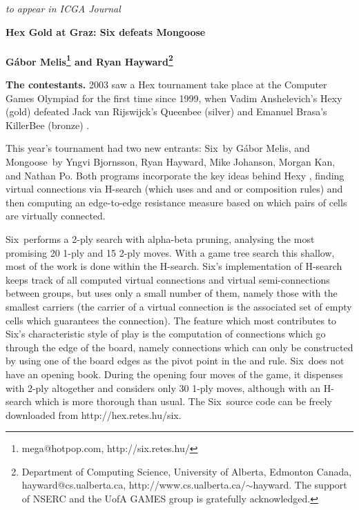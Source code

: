 \documentclass[12pt]{article}
\def\Six{{\sc Six}}
\def\Mg{{\sc Mongoose}}
\begin{document}
\pagestyle{plain}

\vspace*{-.5in}
{\it to appear in ICGA Journal}
\vspace*{.5in}

\begin{center}
{\large\bf Hex Gold at Graz: Six defeats Mongoose} \\ \ \\
{\bf G{\'a}bor Melis\footnote{mega@hotpop.com, http://six.retes.hu/} and
     Ryan Hayward\footnote{Department 
       of Computing Science, 
       University of Alberta, Edmonton Canada,
       hayward@cs.ualberta.ca,
       http://www.cs.ualberta.ca/$\sim$hayward.
       The support of NSERC and 
       the UofA GAMES group is gratefully acknowledged.}
}
\end{center}

{\noindent\large\bf The contestants.}
2003 saw a Hex tournament take place at the Computer Games Olympiad 
for the first time since 1999, when 
Vadim Anshelevich's {\sc Hexy} (gold) defeated 
Jack van Rijswijck's {\sc Queenbee} (silver) and 
Emanuel Brasa's {\sc KillerBee} (bronze) \cite{Ansh00b}.

This year's tournament had two new entrants:
\Six\ by G{\'a}bor Melis, and
\Mg\ by Yngvi Bjornsson, Ryan Hayward, Mike Johanson, 
Morgan Kan, and Nathan Po.
Both programs incorporate the key ideas behind Hexy \cite{Ansh02},
finding virtual connections via H-search 
(which uses {\sc and} and {\sc or} composition rules)
and then computing an edge-to-edge resistance measure 
based on which pairs of cells are virtually connected.

\Six\ performs a 2-ply search with alpha-beta pruning,
analysing the most promising 20 1-ply and 15 2-ply moves.
With a game tree search this shallow,
most of the work is done within the H-search. 
\Six's implementation of H-search keeps track of all computed virtual
connections and virtual semi-connections between groups, 
but uses only a small number of them, 
namely those with the smallest carriers
(the carrier of a virtual connection is the associated
set of empty cells which guarantees the connection). 
The feature which most contributes to 
\Six's characteristic style of play is the computation 
of connections which go through the edge of the board,
namely connections which can only be constructed 
by using one of the board edges as the pivot point in the {\sc and} rule.
\Six\ does not have an opening book.
During the opening four moves of the game, 
it dispenses with 2-ply altogether and
considers only 30 1-ply moves,
although with an H-search which is more thorough than usual.
The \Six\ source code can be freely downloaded from
http://hex.retes.hu/six.
\end{document}
